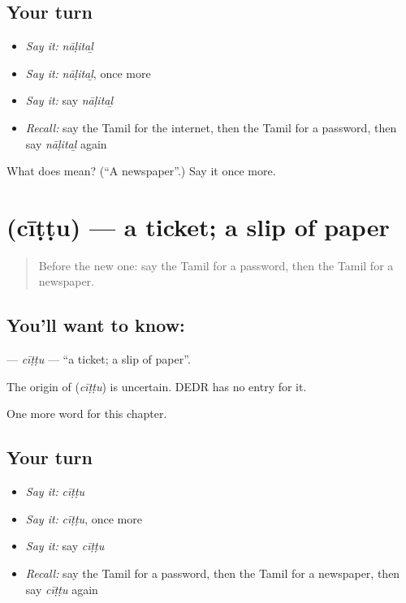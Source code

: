 \subsection*{Your turn}
\begin{itemize}
\raggedright
  \item \emph{Say it:} \emph{nāḷitaḻ}
  \item \emph{Say it:} \emph{nāḷitaḻ}, once more
  \item \emph{Say it:} say \emph{nāḷitaḻ}
  \item \emph{Recall:} say the Tamil for the internet, then the Tamil for a password, then say \emph{nāḷitaḻ} again
\end{itemize}

\begin{tcolorbox}[breakable,colback=teal!4,colframe=teal!35!black,title={Before you move on}]
What does  mean? (\textquotedblleft{}A newspaper\textquotedblright{}.) Say it once more.
\end{tcolorbox}
\section[\texorpdfstring{\ta{சீட்டு} (cīṭṭu)}{சீட்டு (cīṭṭu)}]{ (cīṭṭu) — a ticket; a slip of paper}

\label{lesson:TA-C216-cittu}



\begin{quote}
Before the new one: say the Tamil for a password, then the Tamil for a newspaper.
\end{quote}

\subsection*{You'll want to know: }
\textbf{} — \emph{cīṭṭu} — \textquotedblleft{}a ticket; a slip of paper\textquotedblright{}.

\begin{cousinweb}
The origin of \textbf{} (\emph{cīṭṭu}) is uncertain. DEDR has no entry for it.
\end{cousinweb}

\begin{grammarlens}[title={What you've built}]
One more word for this chapter.
\end{grammarlens}

\subsection*{Your turn}
\begin{itemize}
\raggedright
  \item \emph{Say it:} \emph{cīṭṭu}
  \item \emph{Say it:} \emph{cīṭṭu}, once more
  \item \emph{Say it:} say \emph{cīṭṭu}
  \item \emph{Recall:} say the Tamil for a password, then the Tamil for a newspaper, then say \emph{cīṭṭu} again
\end{itemize}

